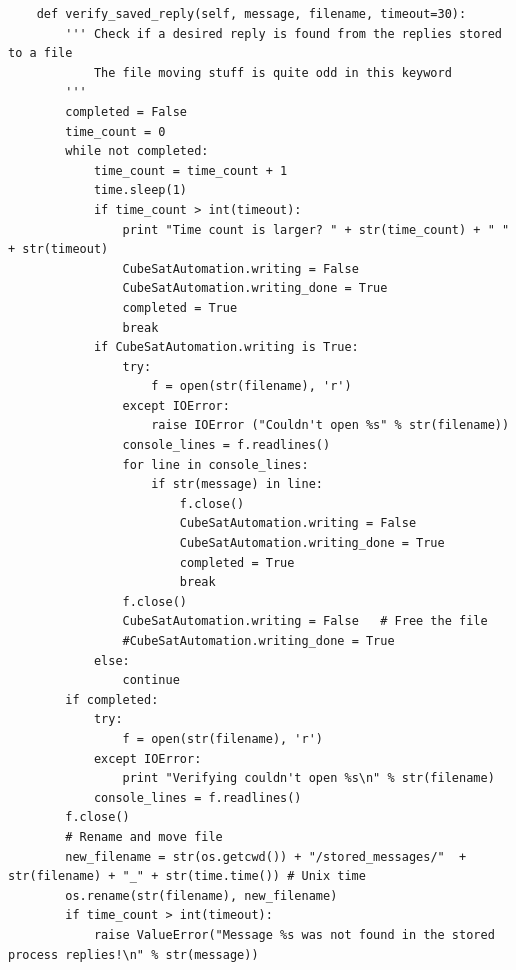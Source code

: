 \documentclass[english,12pt,a4paper,pdftex,elec,utf8]{aaltothesis}
\begin{document}
\begin{verbatim}
	def verify_saved_reply(self, message, filename, timeout=30):
		''' Check if a desired reply is found from the replies stored to a file
			The file moving stuff is quite odd in this keyword
		'''
		completed = False
		time_count = 0
		while not completed:
			time_count = time_count + 1
			time.sleep(1)
			if time_count > int(timeout):
				print "Time count is larger? " + str(time_count) + " " + str(timeout)
				CubeSatAutomation.writing = False
				CubeSatAutomation.writing_done = True
				completed = True
				break
			if CubeSatAutomation.writing is True:
				try:
					f = open(str(filename), 'r')
				except IOError:
					raise IOError ("Couldn't open %s" % str(filename))
				console_lines = f.readlines()
				for line in console_lines:
					if str(message) in line:
						f.close()
						CubeSatAutomation.writing = False
						CubeSatAutomation.writing_done = True
						completed = True
						break
				f.close()
				CubeSatAutomation.writing = False	# Free the file
				#CubeSatAutomation.writing_done = True
			else:
				continue
		if completed:
			try:
				f = open(str(filename), 'r')
			except IOError:
				print "Verifying couldn't open %s\n" % str(filename)
			console_lines = f.readlines()			
		f.close()
		# Rename and move file
		new_filename = str(os.getcwd()) + "/stored_messages/"  + str(filename) + "_" + str(time.time())	# Unix time
		os.rename(str(filename), new_filename)	
		if time_count > int(timeout):
			raise ValueError("Message %s was not found in the stored process replies!\n" % str(message))	
            

\end{verbatim}
\end{document}
